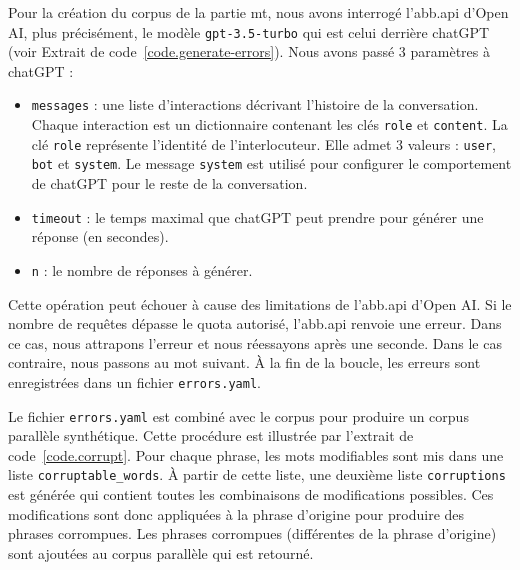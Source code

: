 Pour la création du corpus de la partie \gls{mt},
nous avons interrogé l'\gls{abb.api} d'\foreignlanguage{english}{Open AI}, 
plus précisément, le modèle \verb|gpt-3.5-turbo| qui est celui derrière chatGPT
(voir Extrait de code~\ref{code.generate-errors}).
Nous avons passé 3 paramètres à chatGPT :
\begin{itemize}
    \item \verb|messages| : une liste d'interactions décrivant l'histoire de la conversation.
    Chaque interaction est un dictionnaire contenant les clés \verb|role| et \verb|content|.
    La clé \verb|role| représente l'identité de l'interlocuteur.
    Elle admet 3 valeurs : \verb|user|, \verb|bot| et \verb|system|.
    Le message \verb|system| est utilisé pour configurer le comportement de chatGPT pour le reste de la conversation.
    \item \verb|timeout| : le temps maximal que chatGPT peut prendre pour générer une réponse (en secondes).
    \item \verb|n| : le nombre de réponses à générer.
\end{itemize}
Cette opération peut échouer à cause des limitations de l'\gls{abb.api} d'\foreignlanguage{english}{Open AI}.
Si le nombre de requêtes dépasse le quota autorisé, l'\gls{abb.api} renvoie une erreur.
Dans ce cas, nous attrapons l'erreur et nous réessayons après une seconde.
Dans le cas contraire, nous passons au mot suivant.
À la fin de la boucle, les erreurs sont enregistrées dans un fichier \verb|errors.yaml|.

Le fichier \verb|errors.yaml| est combiné avec le corpus pour produire un corpus parallèle synthétique.
Cette procédure est illustrée par l'extrait de code~\ref{code.corrupt}.
Pour chaque phrase, les mots modifiables sont mis dans une liste \verb|corruptable_words|.
À partir de cette liste, une deuxième liste \verb|corruptions| est générée qui contient 
toutes les combinaisons de modifications possibles.
Ces modifications sont donc appliquées à la phrase d'origine pour produire des phrases corrompues.
Les phrases corrompues (différentes de la phrase d'origine) sont ajoutées au corpus parallèle qui est retourné.



